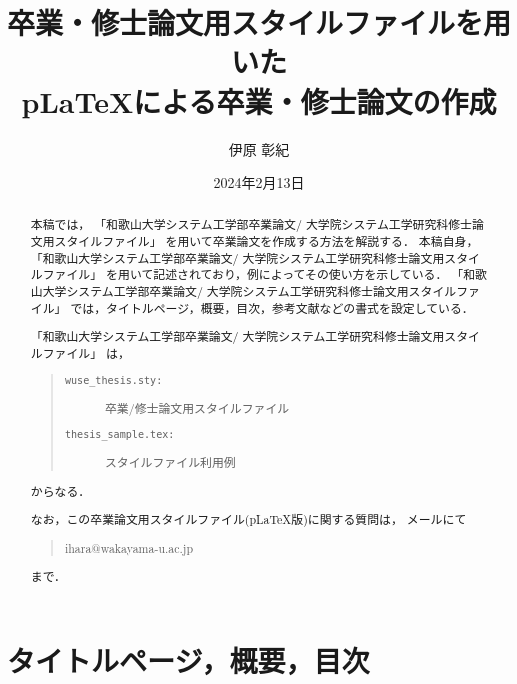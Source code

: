 \documentclass[11pt,dvipdfmx]{jreport}
\title{卒業・修士論文用スタイルファイルを用いた\\
       p\LaTeX による卒業・修士論文の作成}
\author{伊原 彰紀}
\date{2024年2月13日}	%
\begin{document}
\maketitle

\begin{abstract}
本稿では，
「和歌山大学システム工学部卒業論文/
  大学院システム工学研究科修士論文用スタイルファイル」
を用いて卒業論文を作成する方法を解説する．
本稿自身，
「和歌山大学システム工学部卒業論文/
  大学院システム工学研究科修士論文用スタイルファイル」
を用いて記述されており，例によってその使い方を示している．
「和歌山大学システム工学部卒業論文/
  大学院システム工学研究科修士論文用スタイルファイル」
では，タイトルページ，概要，目次，参考文献などの書式を設定している．

「和歌山大学システム工学部卒業論文/
  大学院システム工学研究科修士論文用スタイルファイル」
は，
\begin{quote}
  \begin{description}
    \item[\tt wuse\_thesis.sty:] 卒業/修士論文用スタイルファイル
    \item[\tt thesis\_sample.tex:] スタイルファイル利用例
  \end{description}
\end{quote}
からなる．

なお，この卒業論文用スタイルファイル(p\LaTeX 版)に関する質問は，
メールにて
\begin{quote}
ihara@wakayama-u.ac.jp
\end{quote}
まで．

\end{abstract}

\tableofcontents



\newpage
{}	%



\chapter{タイトルページ，概要，目次}
\end{document}
